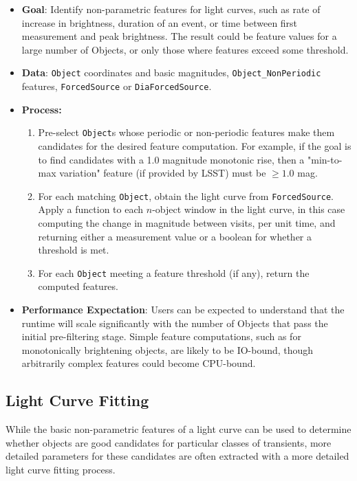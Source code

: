 \documentclass[DM,authoryear,toc]{lsstdoc}
\begin{document}
\begin{itemize}
  \item \textbf{Goal}: Identify non-parametric features for light curves, such
  as rate of increase in brightness, duration of an event, or time between first
  measurement and peak brightness. The result could be feature values for a
  large number of Objects, or only those where features exceed some threshold.
  \item \textbf{Data}: \texttt{Object} coordinates and basic magnitudes,
  \texttt{Object\_NonPeriodic} features, \texttt{ForcedSource} or \texttt{DiaForcedSource}.
  \item \textbf{Process:}
    \begin{enumerate}
      \item Pre-select \texttt{Object}s whose periodic or non-periodic features
      make them candidates for the desired feature computation. For example, if
      the goal is to find candidates with a 1.0 magnitude monotonic rise, then a
      "min-to-max variation" feature (if provided by LSST) must be $\ge 1.0$ mag.
      \item For each matching \texttt{Object}, obtain the light curve from
      \texttt{ForcedSource}. Apply a function to each $n$-object window in the
      light curve, in this case computing the change in magnitude between
      visits, per unit time, and returning either a measurement value or a
      boolean for whether a threshold is met.
      \item For each \texttt{Object} meeting a feature threshold (if any),
      return the computed features.
    \end{enumerate}
  \item \textbf{Performance Expectation}: Users can be expected to understand
  that the runtime will scale significantly with the number of Objects that pass
  the initial pre-filtering stage. Simple feature computations, such as for
  monotonically brightening objects, are likely to be IO-bound, though
  arbitrarily complex features could become CPU-bound.
\end{itemize}

\subsection{Light Curve Fitting}

While the basic non-parametric features of a light curve can be used to
determine whether objects are good candidates for particular classes of
transients, more detailed parameters for these candidates are often extracted
with a more detailed light curve fitting process.
\end{document}
